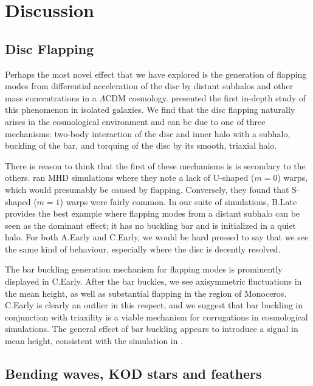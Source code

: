 \section{Discussion} \label{sec:discussion}

\subsection{Disc Flapping}

Perhaps the most novel effect that we have explored is the generation
of flapping modes from differential acceleration of the disc by
distant subhalos and other mass concentrations in a $\Lambda$CDM cosmology.
\citet{sellwood_1996} presented the first in-depth study
of this phenomenon in isolated galaxies. We find that the disc
flapping naturally arises in the cosmological environment and can be
due to one of three mechanisms: two-body interaction of the 
disc and inner halo with a subhalo, buckling of the bar,
and torquing of the disc by its smooth, triaxial halo.

There is reason to think that the first of these mechanisms is is
secondary to the others. \citet{gomez_2017} ran MHD simulations
where they note a lack of U-shaped ($m=0$) warps, which would
presumably be caused by flapping. Conversely, they found that S-shaped
($m=1$) warps were fairly common. In our suite of simulations, B.Late
provides the best example where flapping modes from a distant subhalo can be seen as the
dominant effect; it has no buckling bar and is initialized in a quiet
halo. For both A.Early and C.Early, we would be hard pressed to say
that we see the same kind of behaviour, especially where the disc is
decently resolved.

The bar buckling generation mechanism for flapping modes is
prominently displayed in C.Early. After the bar buckles, we see
axisymmetric fluctuations in the mean height, as well as substantial
flapping in the region of Monoceros. C.Early is clearly an outlier in
this respect, and we suggest that bar buckling in conjunction with
triaxility is a viable mechanism for corrugations in cosmological
simulations. The general effect of bar buckling appears to introduce a
signal in mean height, consistent with the simulation in
\citet{bar_buckling_echo}.

\subsection{Bending waves, KOD stars and feathers}

